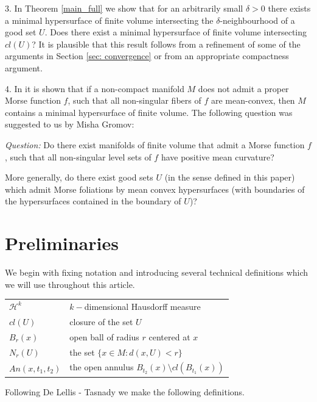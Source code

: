\documentclass[12pt]{amsart}
\theoremstyle{definition}
\begin{document}
3. In Theorem \ref*{main_full} we show that for an arbitrarily small
$\delta>0$ there exists a minimal hypersurface of finite
volume intersecting the $\delta$-neighbourhood of a good
set $U$. Does there exist a minimal hypersurface
of finite volume intersecting $cl(U)$? It is plausible that 
this result follows from a refinement of some of the arguments
in Section \ref*{sec: convergence} or from an appropriate compactness argument.

4. In \cite{Gr} it is shown that if a non-compact manifold
$M$ does not admit a proper Morse function $f$,
such that all non-singular fibers of $f$
are mean-convex, then $M$ contains a minimal
hypersurface of finite volume.
The following question was suggested to us by Misha Gromov:

\textit{Question:} Do there exist
manifolds of finite volume
that admit a 
Morse function $f$, such that all non-singular
level sets of $f$ have positive mean curvature?

More generally, do there exist good sets $U$ (in the sense
defined in this paper) which admit Morse foliations
by mean convex hypersurfaces (with boundaries of
the hypersurfaces
contained in the boundary of $U$)?





\section{Preliminaries} \label{preliminaries}

We begin with fixing notation and 
introducing several technical definitions which we will use throughout this article.

\begin{tabular}{ l l }
  $\mathcal{H}^k$ & $k-$dimensional Hausdorff measure  \\
  $cl(U)$ & closure of the set $U$ \\
  $B_r(x)$ & open ball of radius $r$ centered at $x$ \\
  $N_r(U)$ & the set $\{x \in M: d(x,U)< r\}$  \\
  $An(x,t_1,t_2)$ & the open annulus $B_{t_2}(x) \setminus cl( B_{t_1}(x))$
\end{tabular}

\vspace{0.2in}

Following De Lellis - Tasnady we make the following definitions.
\end{document}
